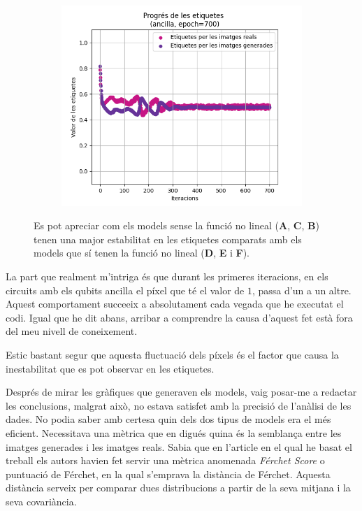 \begin{figure}[H]
\begin{subfigure}[b]{.32\linewidth}
		\includegraphics[width=\linewidth]{figures/data/L_A6.png}
		\caption{}
	\end{subfigure}
	\caption{Es pot apreciar com els models sense la funció no lineal (\textbf{A}, \textbf{C}, \textbf{B}) tenen una major estabilitat en les etiquetes comparats amb els models que sí tenen la funció no lineal (\textbf{D}, \textbf{E} i \textbf{F}).}
	\label{fig:700_labels}
\end{figure}

La part que realment m'intriga és que durant les primeres iteracions, en els circuits amb els qubits ancilla el píxel que té el valor de $1$, passa d'un a un altre. Aquest comportament succeeix a absolutament cada vegada que he executat el codi. Igual que he dit abans, arribar a comprendre la causa d'aquest fet està fora del meu nivell de coneixement.

Estic bastant segur que aquesta fluctuació dels píxels és el factor que causa la inestabilitat que es pot observar en les etiquetes.

Després de mirar les gràfiques que generaven els models, vaig posar-me a redactar les conclusions, malgrat això, no estava satisfet amb la precisió de l'anàlisi de les dades. No podia saber amb certesa quin dels dos tipus de models era el més eficient. Necessitava una mètrica que en digués quina és la semblança entre les imatges generades i les imatges reals. Sabia que en l'article en el qual he basat el treball els autors havien fet servir una mètrica anomenada \textit{Férchet Score} o puntuació de Férchet, en la qual s'emprava la distància de Férchet. Aquesta distància serveix per comparar dues distribucions a partir de la seva mitjana i la seva covariància.

